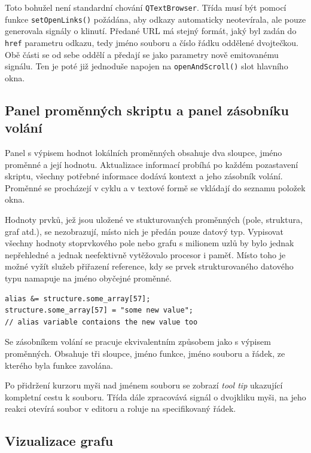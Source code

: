 \documentclass[11pt,twoside,a4paper]{book}
\begin{document}
Toto bohužel není standardní chování \texttt{QTextBrowser}. Třída musí být pomocí funkce \texttt{set\-Open\-Links()} požádána, aby odkazy automaticky neotevírala, ale pouze generovala signály o klinutí. Předané URL má stejný formát, jaký byl zadán do \texttt{href} parametru odkazu, tedy jméno souboru a číslo řádku oddělené dvojtečkou. Obě části se od sebe oddělí a předají se jako parametry nově emitovanému signálu. Ten je poté již jednoduše napojen na \texttt{openAndScroll()} slot hlavního okna.


\subsection{Panel proměnných skriptu a panel zásobníku volání}

Panel s výpisem hodnot lokálních proměnných obsahuje dva sloupce, jméno proměnné a její hodnotu. Aktualizace informací probíhá po každém pozastavení skriptu, všechny potřebné informace dodává kontext a jeho zásobník volání. Proměnné se procházejí v cyklu a v textové formě se vkládají do seznamu položek okna.

Hodnoty prvků, jež jsou uložené ve stukturovaných proměnných (pole, struktura, graf atd.), se nezobrazují, místo nich je předán pouze datový typ. Vypisovat všechny hodnoty stoprvkového pole nebo grafu s milionem uzlů by bylo jednak nepřehledné a jednak neefektivně vytěžovalo procesor i paměť. Místo toho je možné vyžít služeb přiřazení reference, kdy se prvek strukturovaného datového typu namapuje na jméno obyčejné proměnné.

\begin{verbatim}
alias &= structure.some_array[57];
structure.some_array[57] = "some new value";
// alias variable contaions the new value too
\end{verbatim}

Se zásobníkem volání se pracuje ekvivalentním způsobem jako s výpisem proměnných. Obsahuje tři sloupce, jméno funkce, jméno souboru a řádek, ze kterého byla funkce zavolána.

Po přidržení kurzoru myši nad jménem souboru se zobrazí \textit{tool tip} ukazující kompletní cestu k souboru. Třída dále zpracovává signál o dvojkliku myši, na jeho reakci otevírá soubor v editoru a roluje na specifikovaný řádek.


\subsection{Vizualizace grafu}
\end{document}
